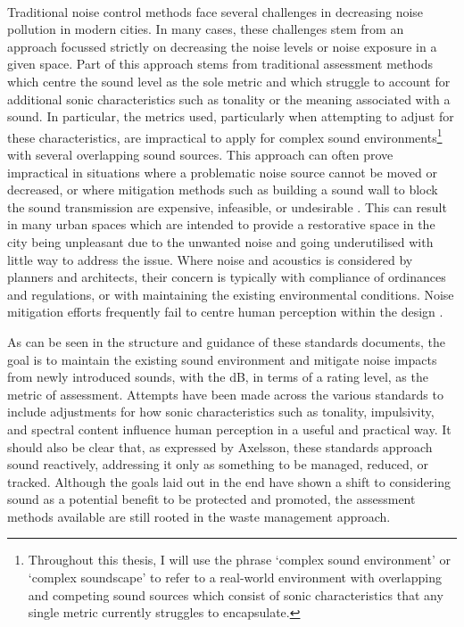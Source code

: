 \paragraph*{} Traditional noise control methods face several challenges in decreasing noise pollution in modern cities. In many cases, these challenges stem from an approach focussed strictly on decreasing the noise levels or noise exposure in a given space. Part of this approach stems from traditional assessment methods which centre the sound level as the sole metric and which struggle to account for additional sonic characteristics such as tonality or the meaning associated with a sound. In particular, the metrics used, particularly when attempting to adjust for these characteristics, are impractical to apply for complex sound environments\footnote{Throughout this thesis, I will use the phrase `complex sound environment' or `complex soundscape' to refer to a real-world environment with overlapping and competing sound sources which consist of sonic characteristics that any single metric currently struggles to encapsulate.} with several overlapping sound sources. This approach can often prove impractical in situations where a problematic noise source cannot be moved or decreased, or where mitigation methods such as building a sound wall to block the sound transmission are expensive, infeasible, or undesirable \citep{Ekici2003Review}. This can result in many urban spaces which are intended to provide a restorative space in the city being unpleasant due to the unwanted noise and going underutilised with little way to address the issue. Where noise and acoustics is considered by planners and architects, their concern is typically with compliance of ordinances and regulations, or with maintaining the existing environmental conditions. Noise mitigation efforts frequently fail to centre human perception within the design \citep{Coelho2016Soundscape}. 

As can be seen in the structure and guidance of these standards documents, the goal is to maintain the existing sound environment and mitigate noise impacts from newly introduced sounds, with the dB, in terms of a rating level, as the metric of assessment. Attempts have been made across the various standards to include adjustments for how sonic characteristics such as tonality, impulsivity, and spectral content influence human perception in a useful and practical way. It should also be clear that, as expressed by Axelsson, these standards approach sound reactively, addressing it only as something to be managed, reduced, or tracked. Although the goals laid out in the \gls{end} have shown a shift to considering sound as a potential benefit to be protected and promoted, the assessment methods available are still rooted in the waste management approach. 


